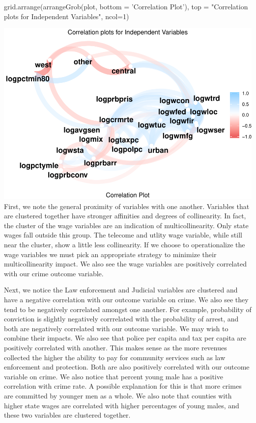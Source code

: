 \documentclass[]{article}
\newenvironment{Shaded}{}{}
\newcommand{\DataTypeTok}[1]{#1}
\newcommand{\DecValTok}[1]{#1}
\newcommand{\KeywordTok}[1]{\textcolor[rgb]{0.00,0.00,1.00}{#1}}
\newcommand{\NormalTok}[1]{#1}
\newcommand{\StringTok}[1]{\textcolor[rgb]{0.00,0.50,0.50}{#1}}
\begin{document}
\begin{Shaded}
\begin{Highlighting}[]
\KeywordTok{grid.arrange}\NormalTok{(}\KeywordTok{arrangeGrob}\NormalTok{(plot, }\DataTypeTok{bottom =} \StringTok{'Correlation Plot'}\NormalTok{), }
             \DataTypeTok{top =} \StringTok{"Correlation plots for Independent Variables"}\NormalTok{, }\DataTypeTok{ncol=}\DecValTok{1}\NormalTok{)}
\end{Highlighting}
\end{Shaded}

\includegraphics{Bagnard_Gaustad_Hartman_Leung_Lab_3_files/figure-latex/unnamed-chunk-58-1.pdf}
First, we note the general proximity of variables with one another.
Variables that are clustered together have stronger affinities and
degrees of collinearity. In fact, the cluster of the wage variables are
an indication of multicollinearity. Only state wages fall outside this
group. The telecome and utlity wage variable, while still near the
cluster, show a little less collinearity. If we choose to operationalize
the wage variables we must pick an appropriate strategy to minimize
their multicollinearity impact. We also see the wage variables are
positively correlated with our crime outcome variable.

Next, we notice the Law enforcement and Judicial variables are clustered
and have a negative correlation with our outcome variable on crime. We
also see they tend to be negatively correlated amongst one another. For
example, probability of conviction is slightly negatively corrrelated
with the probability of arrest, and both are negatively correlated with
our outcome variable. We may wish to combine their impacts. We also see
that police per capita and tax per capita are positively correlated with
another. This makes sense as the more revenues collected the higher the
ability to pay for community services such as law enforcement and
protection. Both are also positively correlated with our outcome
variable on crime. We also notice that percent young male has a positive
correlation with crime rate. A possible explanation for this is that
more crimes are committed by younger men as a whole. We also note that
counties with higher state wages are correlated with higher percentages
of young males, and these two variables are clustered together.
\end{document}
